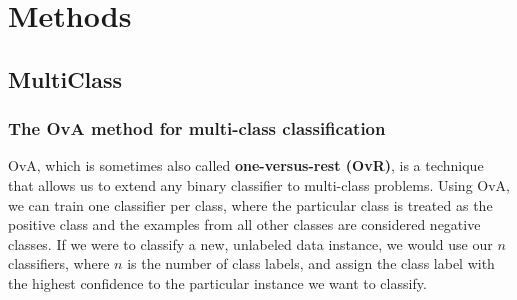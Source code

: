 \chapter{Methods\label{method}}
\section{MultiClass}
\subsection{The OvA method for multi-class classification}
OvA, which is sometimes also called \textbf{one-versus-rest (OvR)}, is a technique that allows us to extend any binary classifier to multi-class problems. Using OvA, we can train one classifier per class, where the particular class is treated as the positive class and the examples from all other classes are considered negative classes. If we were to classify a new, unlabeled data instance, we would use our $n$ classifiers, where $n$ is the number of class labels, and assign the class label with the highest confidence to the particular instance we want to classify.